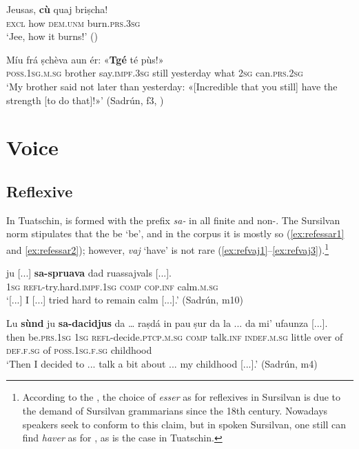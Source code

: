 \ea\label{ex:exclcu}
\gll Jeusas, \textbf{cù} quaj briṣcha!   \\
   \textsc{excl} how \textsc{dem.unm} burn.\textsc{prs.3sg}  \\
\glt `Jee, how it burns!' ()
\z

\ea
\label{ex:excltgej}
\gll Míu frá ṣchèva aun ér: «\textbf{Tgé} té pùs!»   \\
\textsc{poss.1sg.m.sg} brother say.\textsc{impf.3sg} still yesterday what \textsc{2sg} can.\textsc{prs.2sg} \\
\glt `My brother said not later than yesterday: «[Incredible that you still] have the strength [to do that]!»' (Sadrún, f3, )
\z

\section{Voice}\label{sec:5.5}

\subsection{Reflexive}\label{sec:5.5.1}

In Tuatschin,  is formed with the prefix \textit{sa-} in all finite and non-. The Sursilvan norm stipulates that the  be  `be', and in the corpus it is mostly so (\ref{ex:refessar1} and \ref{ex:refessar2}); however, \textit{vaj} `have' is not rare (\ref{ex:refvaj1}--\ref{ex:refvaj3}).\footnote{According to the , the choice of \textit{esser} as  for reflexives in Sursilvan is due to the demand of Sursilvan grammarians since the 18th century. Nowadays speakers seek to conform to this claim, but in spoken Sursilvan, one still can find \textit{haver} as  for , as is the case in Tuatschin.}

\ea\label{ex:refessar1}
\gll [...] ju [...] \textbf{sa-spruava} dad  ruassajvals [...].\\
{} \textsc{1sg} {}  \textsc{refl-}try.hard.\textsc{impf.1sg} \textsc{comp} \textsc{cop.inf} calm.\textsc{m.sg}\\
\glt `[...] I [...] tried hard to remain calm [...].' (Sadrún, m10)
\z

\ea\label{ex:refessar2}
\gll Lu \textbf{sùnd} ju \textbf{sa-dacidjus} da … raṣdá in pau ṣur da la ... da mi’ ufaunza [...].   \\
then  be.\textsc{prs.1sg}  \textsc{1sg}  \textsc{refl}-decide.\textsc{ptcp.m.sg}  \textsc{comp} {} talk.\textsc{inf} \textsc{indef.m.sg} little over of  \textsc{def.f.sg} {} of \textsc{poss.1sg.f.sg} childhood\\
\glt `Then I decided to ... talk a bit about ... my childhood [...].' (Sadrún, m4)
\z


